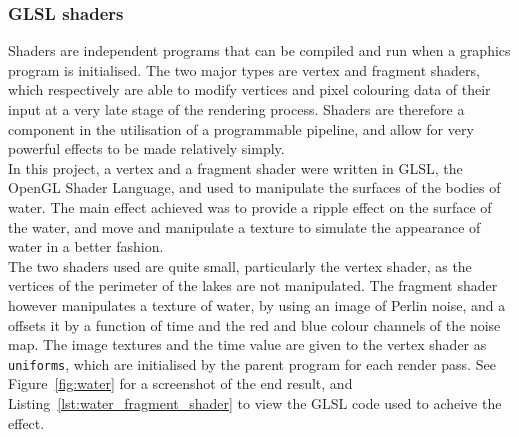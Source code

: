        \subsubsection{GLSL shaders} %
        \label{ssub:glsl_shaders}
            Shaders are independent programs that can be compiled and run when a graphics program is initialised.
            The two major types are vertex and fragment shaders, which respectively are able to modify vertices and pixel colouring data of their input at a very late stage of the rendering process.
            Shaders are therefore a component in the utilisation of a programmable pipeline, and allow for very powerful effects to be made relatively simply.\\

            In this project, a vertex and a fragment shader were written in GLSL, the OpenGL Shader Language, and used to manipulate the surfaces of the bodies of water.
            The main effect achieved was to provide a ripple effect on the surface of the water, and move and manipulate a texture to simulate the appearance of water in a better fashion.\\

            The two shaders used are quite small, particularly the vertex shader, as the vertices of the perimeter of the lakes are not manipulated.
            The fragment shader however manipulates a texture of water, by using an image of Perlin noise, and a offsets it by a function of time and the red and blue colour channels of the noise map.
            The image textures and the time value are given to the vertex shader as \texttt{uniforms}, which are initialised by the parent program for each render pass. See Figure~\ref{fig:water} for a screenshot of the end result, and Listing~\ref{lst:water_fragment_shader} to view the GLSL code used to acheive the effect.

